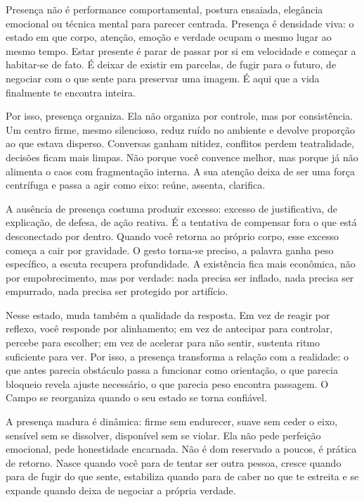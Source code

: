 \documentclass[12pt]{book}
\begin{document}
Presença não é performance comportamental, postura ensaiada, elegância emocional ou técnica mental para parecer centrada. Presença é densidade viva: o estado em que corpo, atenção, emoção e verdade ocupam o mesmo lugar ao mesmo tempo. Estar presente é parar de passar por si em velocidade e começar a habitar-se de fato. É deixar de existir em parcelas, de fugir para o futuro, de negociar com o que sente para preservar uma imagem. É aqui que a vida finalmente te encontra inteira.

Por isso, presença organiza. Ela não organiza por controle, mas por consistência. Um centro firme, mesmo silencioso, reduz ruído no ambiente e devolve proporção ao que estava disperso. Conversas ganham nitidez, conflitos perdem teatralidade, decisões ficam mais limpas. Não porque você convence melhor, mas porque já não alimenta o caos com fragmentação interna. A sua atenção deixa de ser uma força centrífuga e passa a agir como eixo: reúne, assenta, clarifica.

A ausência de presença costuma produzir excesso: excesso de justificativa, de explicação, de defesa, de ação reativa. É a tentativa de compensar fora o que está desconectado por dentro. Quando você retorna ao próprio corpo, esse excesso começa a cair por gravidade. O gesto torna-se preciso, a palavra ganha peso específico, a escuta recupera profundidade. A existência fica mais econômica, não por empobrecimento, mas por verdade: nada precisa ser inflado, nada precisa ser empurrado, nada precisa ser protegido por artifício.

Nesse estado, muda também a qualidade da resposta. Em vez de reagir por reflexo, você responde por alinhamento; em vez de antecipar para controlar, percebe para escolher; em vez de acelerar para não sentir, sustenta ritmo suficiente para ver. Por isso, a presença transforma a relação com a realidade: o que antes parecia obstáculo passa a funcionar como orientação, o que parecia bloqueio revela ajuste necessário, o que parecia peso encontra passagem. O Campo se reorganiza quando o seu estado se torna confiável.

A presença madura é dinâmica: firme sem endurecer, suave sem ceder o eixo, sensível sem se dissolver, disponível sem se violar. Ela não pede perfeição emocional, pede honestidade encarnada. Não é dom reservado a poucos, é prática de retorno. Nasce quando você para de tentar ser outra pessoa, cresce quando para de fugir do que sente, estabiliza quando para de caber no que te estreita e se expande quando deixa de negociar a própria verdade.
\end{document}
